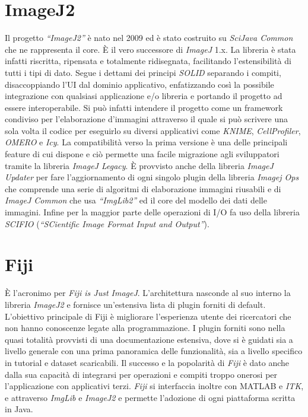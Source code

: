 \section{ImageJ2}
\noindent Il progetto \textit{``ImageJ2''} è nato nel 2009 ed è stato costruito su \textit{SciJava Common} che ne rappresenta il core. È il vero successore di \textit{ImageJ} 1.x. La libreria è stata infatti riscritta, ripensata e totalmente ridisegnata, facilitando l'estensibilità di tutti i tipi di dato. Segue i dettami dei principi \textit{SOLID} separando i compiti, disaccoppiando l'UI dal dominio applicativo, enfatizzando così la possibile integrazione con qualsiasi applicazione e/o libreria e portando il progetto ad essere interoperabile. Si può infatti intendere il progetto come un framework condiviso per l'elaborazione d'immagini attraverso il quale si può scrivere una sola volta il codice per eseguirlo su diversi applicativi come \textit{KNIME}, \textit{CellProfiler}, \textit{OMERO} e \textit{Icy}. La compatibilità verso la prima versione è una delle principali feature di cui dispone e ciò permette una facile migrazione agli sviluppatori tramite la libreria \textit{ImageJ Legacy}. È provvisto anche della libreria \textit{ImageJ Updater} per fare l'aggiornamento di ogni singolo plugin della libreria \textit{Imagej Ops} che comprende una serie di algoritmi di elaborazione immagini riusabili e di \textit{ImageJ Common} che usa \textit{``ImgLib2''} ed il core del modello dei dati delle immagini.
Infine per la maggior parte delle operazioni di I/O fa uso della libreria \textit{SCIFIO} (\textit{``SCientific Image Format Input and Output''}).


\section{Fiji}
\noindent È l'acronimo per \textit{Fiji is Just ImageJ}. L'architettura nasconde al suo interno la libreria \textit{ImageJ2} e fornisce un'estensiva lista di plugin forniti di default.
L'obiettivo principale di Fiji è migliorare l'esperienza utente dei ricercatori che non hanno conoscenze legate alla programmazione. I plugin forniti sono nella quasi totalità provvisti di una documentazione estensiva, dove si è guidati sia a livello generale con una prima panoramica delle funzionalità, sia a livello specifico in tutorial e dataset scaricabili. Il successo e la popolarità di \textit{Fiji} è dato anche dalla sua capacità di integrarsi per operazioni e compiti troppo onerosi per l'applicazione con applicativi terzi. \textit{Fiji} si interfaccia inoltre con MATLAB e \textit{ITK}, e attraverso \textit{ImgLib} e \textit{ImageJ2} e permette l'adozione di ogni piattaforma scritta in Java.



